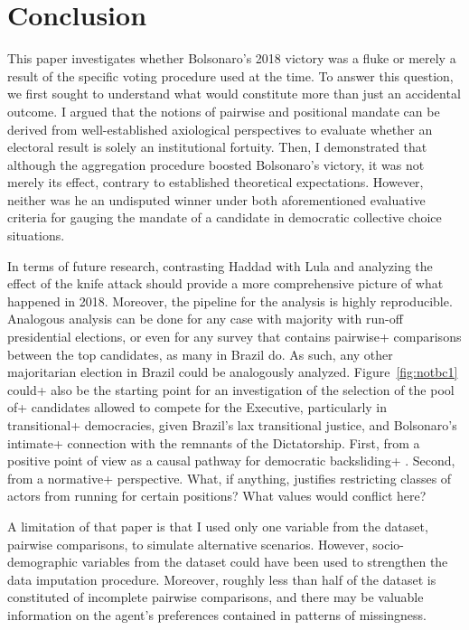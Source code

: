 \documentclass[hidelinks,11pt]{article} \usepackage[utf8]{inputenc}
\begin{document}
\section{Conclusion}

This paper investigates whether Bolsonaro's 2018 victory was a fluke or merely a result of the specific voting procedure used at the time. To answer this question, we first sought to understand what would constitute more than just an accidental outcome. I argued that the notions of pairwise and positional mandate can be derived from well-established axiological perspectives to evaluate whether an electoral result is solely an institutional fortuity. Then, I demonstrated that although the aggregation procedure boosted Bolsonaro's victory, it was not merely its effect, contrary to established theoretical expectations. However, neither was he an undisputed winner under both aforementioned evaluative criteria for gauging the mandate of a candidate in democratic collective choice situations.

In terms of future research, contrasting Haddad with Lula and analyzing the effect of the knife attack should provide a more comprehensive picture of what happened in 2018. Moreover, the pipeline for the analysis is highly reproducible. Analogous analysis can be done for any case with majority with run-off presidential elections, or even for any survey that contains pairwise+ comparisons between the top candidates, as many in Brazil do. As such, any other majoritarian election in Brazil could be analogously analyzed. Figure~\ref{fig:notbc1} could+ also be the starting point for an investigation of the selection of the pool of+ candidates allowed to compete for the Executive, particularly in transitional+ democracies, given Brazil's lax transitional justice, and Bolsonaro's intimate+ connection with the remnants of the Dictatorship. First, from a positive point of view as a causal pathway for democratic backsliding+ \parencite{svolik2008authoritarian, nalepa2022after}. Second, from a normative+ perspective. What, if anything, justifies restricting classes of actors from running for certain positions? What values would conflict here?

A  limitation of that paper is that I used only one variable from the dataset, pairwise comparisons, to simulate alternative scenarios. However, socio-demographic variables from the dataset could have been used to strengthen the data imputation procedure. Moreover, roughly less than half of the dataset is constituted of incomplete pairwise comparisons, and there may be valuable information on the agent's preferences contained in patterns of missingness.
\end{document}
